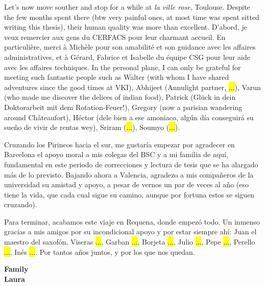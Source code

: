 Let's now move souther and stop for a while at \textsl{la ville rose}, Toulouse. Despite the few months spent there (btw very painful ones, at most time was spent sitted writing this thesis), their human quality was more than excellent. D'abord, je veux remercier aux gens du CERFACS pour leur charmant accueil. En particulière, merci à Michèle pour son amabilité et son guidance avec les affaires administratives, et à Gérard, Fabrice et Isabelle du équipe CSG pour leur aide avec les affaires techniques. In the personal plane, I can only be grateful for meeting such fantastic people such as Walter (with whom I have shared adventures since the good times at VKI), Abhijeet (Annulight partner, \hl{...}), Varun (who made me discover the delices of indian food), Patrick (Glück in dein Doktorarbeit mit dem Rotation-Feuer!), Gregory (now a parisian wandering around Châteaufort), Héctor (dele bien a ese amoniaco, algún día conseguirá su sueño de vivir de rentas wey), Sriram (\hl{...}), Soumyo (\hl{...}).

Cruzando los Pirineos hacia el sur, me gustaría empezar por agradecer en Barcelona el apoyo moral a mis colegas del BSC y a mi familia de aquí, fundamental en este periodo de correcciones y lectura de tesis que se ha alargado más de lo previsto. Bajando ahora a Valencia, agradezo a mis compañeros de la universidad su amistad y apoyo, a pesar de vernos un par de veces al año (eso tiene la vida, que cada cual sigue su camino, aunque por fortuna estos se siguen cruzando).

Para terminar, acabamos este viaje en Requena, donde empezó todo. Un inmenso gracias a mis amigos por su incondicional apoyo y por estar siempre ahí: Juan el maestro del saxofón, Viseras \hl{...}, Garban \hl{...}, Borjeta \hl{...}, Julio \hl{...}, Pepe \hl{...}, Perello \hl{...}, Inés \hl{...}. Por tantos años juntos, y por los que nos quedan.




\textbf{Family} \\


\textbf{Laura}


%

